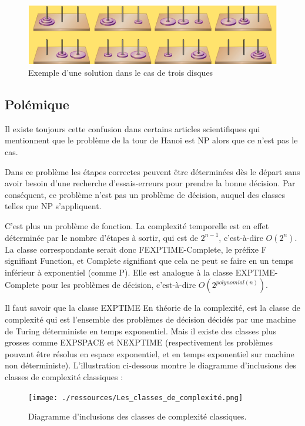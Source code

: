 \begin{figure}[H]
    \centering
        \includegraphics[scale=0.5]{./ressources/Présentation_du_problème.png}
        \caption{Exemple d'une solution dans le cas de trois disques}
    \label{fig:representationProbleme}
\end{figure}

\subsection{Polémique}
Il existe toujours cette confusion dans certains articles scientifiques qui mentionnent que le problème de la tour de Hanoi est NP alors que ce n'est pas le cas.

Dans ce problème les étapes correctes peuvent être déterminées dès le départ sans avoir besoin d'une recherche d'essais-erreurs pour prendre la bonne décision. Par conséquent, ce problème n'est pas un problème de décision, auquel des classes telles que NP s'appliquent.

C'est plus un problème de fonction. La complexité temporelle est en effet déterminée par le nombre d'étapes à sortir, qui est de $2^{n-1}$, c'est-à-dire $O(2^n).$
La classe correspondante serait donc FEXPTIME-Complete, le préfixe F signifiant Function, et Complete signifiant que cela ne peut se faire en un temps inférieur à exponentiel (comme P). Elle est analogue à la classe EXPTIME-Complete pour les problèmes de décision, c'est-à-dire $O(2^{polynomial(n)})$.

Il faut savoir que la classe EXPTIME En théorie de la complexité, est la classe de complexité qui est l'ensemble des problèmes de décision décidés par une machine de Turing déterministe en temps exponentiel.  Mais il existe des classes plus grosses comme EXPSPACE et NEXPTIME (respectivement les problèmes pouvant être résolus en espace exponentiel, et en temps exponentiel sur machine non déterministe).
L'illustration ci-dessous montre le diagramme d'inclusions des classes de complexité classiques :
\begin{figure}[H]
    \centering
        \texttt{[image: ./ressources/Les\_classes\_de\_complexité.png]}
        \caption{Diagramme d'inclusions des classes de complexité classiques.}
    \label{fig:classeComplexite}
\end{figure}

